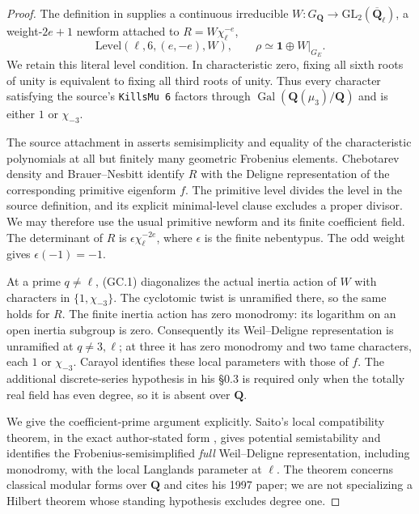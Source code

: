 \documentclass[11pt,a4paper]{article}
\theoremstyle{definition}
\begin{document}
\begin{proof}
The definition in
 supplies a continuous
irreducible $W:G_{\mathbf Q}\to\mathrm{GL}_2(\overline{\mathbf Q}_\ell)$,
a weight-$2e+1$ newform attached to $R=W\chi_\ell^{-e}$,
\[
 \mathrm{Level}(\ell,6,(e,-e),W),
 \qquad \rho\simeq\mathbf1\oplus W|_{G_E}.
 \tag{GC.1}
\]
We retain this literal level condition. In characteristic zero, fixing
all sixth roots of unity is equivalent to fixing all third roots of
unity. Thus every character satisfying the source's
\texttt{KillsMu 6} factors through
$\operatorname{Gal}(\mathbf Q(\mu_3)/\mathbf Q)$ and is either
$1$ or $\chi_{-3}$.

The source attachment in 
asserts semisimplicity and equality of the characteristic polynomials
at all but finitely many geometric Frobenius elements. Chebotarev
density and Brauer--Nesbitt identify $R$ with the Deligne representation
of the corresponding primitive eigenform $f$. The primitive level divides
the level in the source definition, and its explicit minimal-level clause
excludes a proper divisor. We may therefore use the usual primitive
newform and its finite coefficient field. The determinant of $R$ is
$\epsilon\chi_\ell^{-2e}$, where $\epsilon$ is the finite nebentypus.
The odd weight gives $\epsilon(-1)=-1$.

At a prime $q\ne\ell$, (GC.1) diagonalizes the actual inertia action of
$W$ with characters in $\{1,\chi_{-3}\}$. The cyclotomic twist is
unramified there, so the same holds for $R$. The finite inertia action
has zero monodromy: its logarithm on an open inertia subgroup is zero.
Consequently its Weil--Deligne representation is unramified at
$q\ne3,\ell$; at three it has zero monodromy and two tame characters,
each $1$ or $\chi_{-3}$. Carayol
\cite[\S0.7, Theorem~A, pp.~410--411]{K17Carayol1986}
identifies these local parameters with those of $f$. The additional
discrete-series hypothesis in his \S0.3 is required only when the
totally real field has even degree, so it is absent over $\mathbf Q$.

We give the coefficient-prime argument explicitly. Saito's
local compatibility theorem, in the exact author-stated form
\cite[\S2c, Theorem~3, p.~9; definitions on pp.~7--8]{K17SaitoSurvey},
gives potential semistability and identifies the Frobenius-semisimplified
\emph{full} Weil--Deligne representation, including monodromy, with the
local Langlands parameter at $\ell$. The theorem concerns classical
modular forms over $\mathbf Q$ and cites his 1997 paper; we are not
specializing a Hilbert theorem whose standing hypothesis excludes degree
one.


\end{proof}
\end{document}
